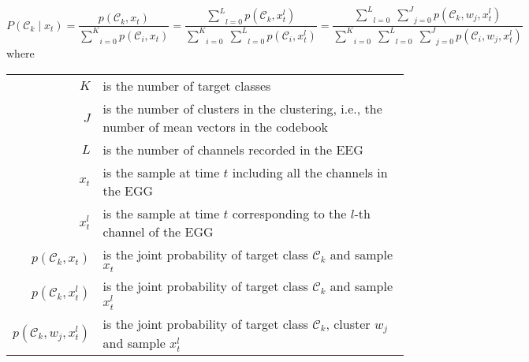 \documentclass[a4paper,12pt]{article}
\begin{document}
\pagestyle{empty}

\[
    P(\mathcal{C}_{k} \mid x_{t}) = 
    \frac{p(\mathcal{C}_{k}, x_{t})}{\underset{i=0}{\overset{K}{\sum}} p(\mathcal{C}_{i}, x_{t})} =
    \frac{\underset{l=0}{\overset{L}{\sum}} p(\mathcal{C}_{k}, x_{t}^{l})}{\underset{i=0}{\overset{K}{\sum}} \; \underset{l=0}{\overset{L}{\sum}} p(\mathcal{C}_{i}, x_{t}^{l})} =
    \frac{\underset{l=0}{\overset{L}{\sum}} \; \underset{j=0}{\overset{J}{\sum}} p(\mathcal{C}_{k}, w_{j}, x_{t}^{l})}{\underset{i=0}{\overset{K}{\sum}} \; \underset{l=0}{\overset{L}{\sum}} \; \underset{j=0}{\overset{J}{\sum}} p(\mathcal{C}_{i}, w_{j}, x_{t}^{l})}
\]
where
\begin{center}
\begin{tabular}{rp{110mm}}
$K$ & is the number of target classes \\
$J$ & is the number of clusters in the clustering, i.e., the number of mean vectors in the codebook \\
$L$ & is the number of channels recorded in the EEG \\
$x_{t}$ & is the sample at time $t$ including all the channels in the EGG \\
$x_{t}^{l}$ & is the sample at time $t$ corresponding to the $l$-th channel of the EGG \\
$p(\mathcal{C}_{k}, x_{t})$ & is the joint probability of target class $\mathcal{C}_{k}$ and sample $x_{t}$ \\
$p(\mathcal{C}_{k}, x_{t}^{l})$ & is the joint probability of target class $\mathcal{C}_{k}$ and sample $x_{t}^{l}$ \\
$p(\mathcal{C}_{k}, w_{j}, x_{t}^{l})$ & is the joint probability of target class $\mathcal{C}_{k}$, cluster $w_{j}$ and sample $x_{t}^{l}$ \\
\end{tabular}
\end{center}

\newpage
\end{document}
